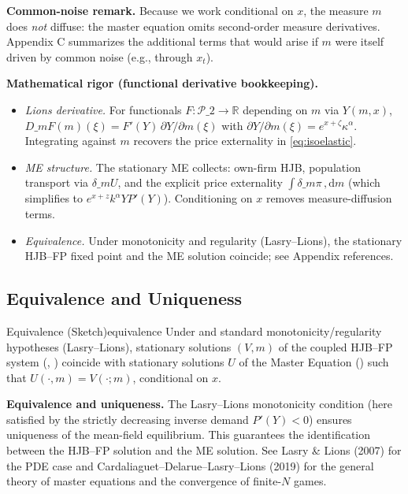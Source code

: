 \documentclass[11pt,letterpaper,oneside]{article}
\numberwithin{equation}{section}
\newcommand{\ac}[1]{{\mdseries\textsc{#1}}}
\newcommand{\R}{\mathbb{R}}
\newcommand{\1}{\mathbf{1}}
\newcommand{\diff}{,\mathrm{d}}
\newcommand{\dmU}{\delta\_m U}
\newcommand{\Dm}{D\_m}
\begin{document}
\begin{tcolorbox}[didacticstyle]
\textbf{Common-noise remark.} Because we work conditional on $x$, the measure $m$ does \emph{not} diffuse: the master equation omits second-order measure derivatives. Appendix C summarizes the additional terms that would arise if $m$ were itself driven by common noise (e.g., through $x_t$).
\end{tcolorbox}

\begin{tcolorbox}[mathstyle]
\textbf{Mathematical rigor (functional derivative bookkeeping).}
\begin{itemize}[leftmargin=1.15em,itemsep=0.25em]
  \item \emph{Lions derivative.} For functionals $F: \mathcal P\_2\to\R$ depending on $m$ via $Y(m,x)$, $\Dm F(m)(\xi)=F'(Y)\,\partial Y/\partial m(\xi)$ with $\partial Y/\partial m(\xi)=e^{x+\zeta}\kappa^{\alpha}$. Integrating against $m$ recovers the price externality in \eqref{eq:isoelastic}.
  \item \emph{ME structure.} The stationary ME collects: own-firm HJB, population transport via $\dmU$, and the explicit price externality $\int \delta\_m \pi\,\diff m$ (which simplifies to $e^{x+z}k^\alpha Y P'(Y)$). Conditioning on $x$ removes measure-diffusion terms.
  \item \emph{Equivalence.} Under monotonicity and regularity (Lasry--Lions), the stationary HJB--FP fixed point and the ME solution coincide; see Appendix references.
\end{itemize}
\end{tcolorbox}

\subsection{Equivalence and Uniqueness}

\begin{theorem}{Equivalence (Sketch)}{equivalence}
Under  and standard monotonicity/regularity hypotheses (Lasry--Lions), stationary solutions $(V,m)$ of the coupled \ac{HJB}--\ac{FP} system (, ) coincide with stationary solutions $U$ of the Master Equation () such that $U(\cdot, m) = V(\cdot; m)$, conditional on $x$.
\end{theorem}

\begin{tcolorbox}[literaturestyle]
\textbf{Equivalence and uniqueness.} The Lasry--Lions monotonicity condition (here satisfied by the strictly decreasing inverse demand $P'(Y)<0$) ensures uniqueness of the mean-field equilibrium. This guarantees the identification between the HJB--FP solution and the ME solution. See Lasry \& Lions (2007) for the PDE case and Cardaliaguet--Delarue--Lasry--Lions (2019) for the general theory of master equations and the convergence of finite-$N$ games.
\end{tcolorbox}
\end{document}
